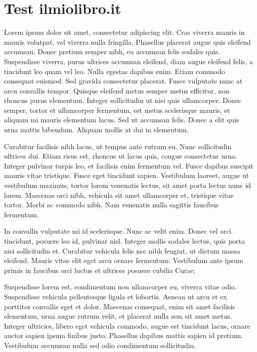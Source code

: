 \chapter*{Test ilmiolibro.it}

Lorem ipsum dolor sit amet, consectetur adipiscing elit. Cras viverra mauris in mauris volutpat, vel viverra nulla fringilla. Phasellus placerat augue quis eleifend accumsan. Donec pretium semper nibh, eu accumsan felis sodales quis. Suspendisse viverra, purus ultrices accumsan eleifend, diam augue eleifend felis, a tincidunt leo quam vel leo. Nulla egestas dapibus enim. Etiam commodo consequat euismod. Sed gravida consectetur placerat. Fusce vulputate nunc at arcu convallis tempor. Quisque eleifend metus semper metus efficitur, non rhoncus purus elementum. Integer sollicitudin ut nisi quis ullamcorper. Donec semper, tortor et ullamcorper fermentum, est metus scelerisque mauris, et aliquam mi mauris elementum lacus. Sed ut accumsan felis. Donec a elit quis urna mattis bibendum. Aliquam mollis at dui in elementum.

Curabitur facilisis nibh lacus, ut tempus ante rutrum eu. Nunc sollicitudin ultrices dui. Etiam risus est, rhoncus ut lacus quis, congue consectetur urna. Integer pulvinar turpis leo, et facilisis enim fermentum vel. Fusce dapibus suscipit mauris vitae tristique. Fusce eget tincidunt sapien. Vestibulum laoreet, augue ut vestibulum maximus, tortor lorem venenatis lectus, sit amet porta lectus nunc id lorem. Maecenas orci nibh, vehicula sit amet ullamcorper et, tristique vitae tortor. Morbi ac commodo nibh. Nam venenatis nulla sagittis faucibus fermentum.

In convallis vulputate mi id scelerisque. Nunc ac velit enim. Donec vel orci tincidunt, posuere leo id, pulvinar nisl. Integer mollis sodales lectus, quis porta nisi sollicitudin et. Curabitur vehicula felis nec nibh feugiat, ut dictum massa eleifend. Mauris vitae elit eget arcu ornare fermentum. Vestibulum ante ipsum primis in faucibus orci luctus et ultrices posuere cubilia Curae;

Suspendisse lorem est, condimentum non ullamcorper eu, viverra vitae odio. Suspendisse vehicula pellentesque ligula et lobortis. Aenean ut arcu et ex porttitor convallis eget et dolor. Maecenas consequat, enim sit amet facilisis elementum, urna augue rutrum velit, et placerat nulla sem sit amet metus. Integer ultricies, libero eget vehicula commodo, augue est tincidunt lacus, ornare auctor sapien ipsum finibus justo. Phasellus dapibus mattis sapien id pretium. Vestibulum accumsan nulla sed odio condimentum sollicitudin.

